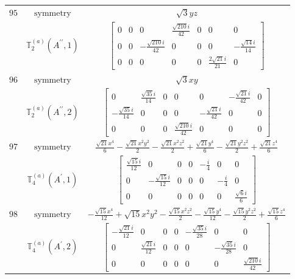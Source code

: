 \documentclass[fleqn,8pt,landscape]{jsarticle}
\begin{document}
\begin{longtable}{ccc}
$ 95 $ & $ \text{symmetry} $ & $ \sqrt{3} y z $ \\
$  $ & $ \mathbb{T}_{2}^{(a)}(A^{\prime\prime},1) $ & $ \begin{bmatrix} 0 & 0 & 0 & \frac{\sqrt{210} i}{42} & 0 & 0 & 0 \\ 0 & 0 & - \frac{\sqrt{210} i}{42} & 0 & 0 & 0 & - \frac{\sqrt{14} i}{14} \\ 0 & 0 & 0 & 0 & 0 & \frac{2 \sqrt{21} i}{21} & 0 \end{bmatrix} $ \\ \hline
$ 96 $ & $ \text{symmetry} $ & $ \sqrt{3} x y $ \\
$  $ & $ \mathbb{T}_{2}^{(a)}(A^{\prime\prime},2) $ & $ \begin{bmatrix} 0 & \frac{\sqrt{35} i}{14} & 0 & 0 & 0 & - \frac{\sqrt{21} i}{42} & 0 \\ - \frac{\sqrt{35} i}{14} & 0 & 0 & 0 & - \frac{\sqrt{21} i}{42} & 0 & 0 \\ 0 & 0 & 0 & \frac{\sqrt{210} i}{42} & 0 & 0 & 0 \end{bmatrix} $ \\ \hline
$ 97 $ & $ \text{symmetry} $ & $ \frac{\sqrt{21} x^{4}}{6} - \frac{\sqrt{21} x^{2} y^{2}}{2} - \frac{\sqrt{21} x^{2} z^{2}}{2} + \frac{\sqrt{21} y^{4}}{6} - \frac{\sqrt{21} y^{2} z^{2}}{2} + \frac{\sqrt{21} z^{4}}{6} $ \\
$  $ & $ \mathbb{T}_{4}^{(a)}(A^{\prime},1) $ & $ \begin{bmatrix} \frac{\sqrt{15} i}{12} & 0 & 0 & 0 & - \frac{i}{4} & 0 & 0 \\ 0 & - \frac{\sqrt{15} i}{12} & 0 & 0 & 0 & - \frac{i}{4} & 0 \\ 0 & 0 & 0 & 0 & 0 & 0 & \frac{\sqrt{6} i}{6} \end{bmatrix} $ \\ \hline
$ 98 $ & $ \text{symmetry} $ & $ - \frac{\sqrt{15} x^{4}}{12} + \sqrt{15} x^{2} y^{2} - \frac{\sqrt{15} x^{2} z^{2}}{2} - \frac{\sqrt{15} y^{4}}{12} - \frac{\sqrt{15} y^{2} z^{2}}{2} + \frac{\sqrt{15} z^{4}}{6} $ \\
$  $ & $ \mathbb{T}_{4}^{(a)}(A^{\prime},2) $ & $ \begin{bmatrix} - \frac{\sqrt{21} i}{12} & 0 & 0 & 0 & - \frac{\sqrt{35} i}{28} & 0 & 0 \\ 0 & \frac{\sqrt{21} i}{12} & 0 & 0 & 0 & - \frac{\sqrt{35} i}{28} & 0 \\ 0 & 0 & 0 & 0 & 0 & 0 & \frac{\sqrt{210} i}{42} \end{bmatrix} $ \\ \hline

\end{longtable}
\end{document}

